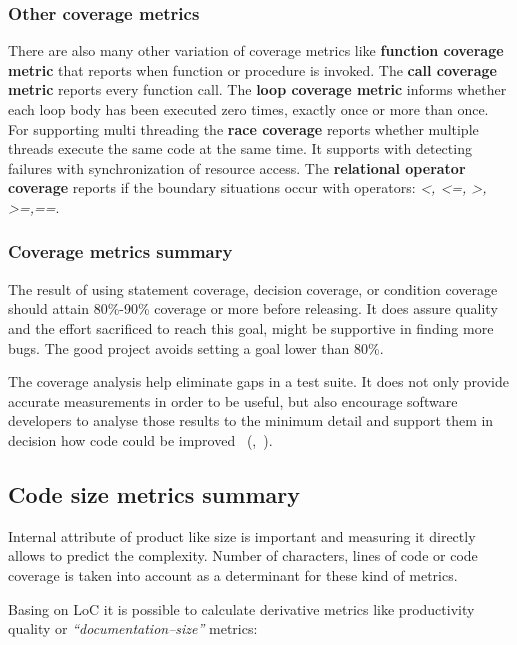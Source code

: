 \subsubsection{Other coverage metrics} 
There are also many other variation of coverage metrics like\textbf{ function coverage metric} that reports when function or procedure is invoked. The \textbf{call coverage metric} reports every function call. The \textbf{ loop coverage metric} informs whether each loop body has been executed zero times, exactly once or more than once. For supporting multi threading the \textbf{race coverage} reports whether multiple threads execute the same code at the same time. It supports with detecting failures with synchronization of resource access. The \textbf{relational operator coverage} reports if the boundary situations occur with operators: \textit{\textless, \textless=, \textgreater, \textgreater=,==}. 

\subsubsection{Coverage metrics summary}
The result of using statement coverage, decision coverage, or condition coverage should attain 80\%-90\% coverage or more before releasing. It does assure quality and the effort sacrificed to reach this goal, might be supportive in finding more bugs. The good project avoids setting a goal lower than 80\%.

The coverage analysis help eliminate gaps in a test suite. It does not only provide accurate measurements in order to be useful, but also encourage software developers to analyse those results to the minimum detail and support them in decision how code could be improved ~(\cite{coverage1},~\cite{coverage2}).

\subsection{Code size metrics summary}
Internal attribute of product like size is important and measuring it directly allows to predict the complexity. Number of characters, lines of code or code coverage is taken into account as a determinant for these kind of metrics.  

Basing on \ac{LoC} it is possible to calculate derivative metrics like productivity quality or \textit{``documentation--size''} metrics: 

